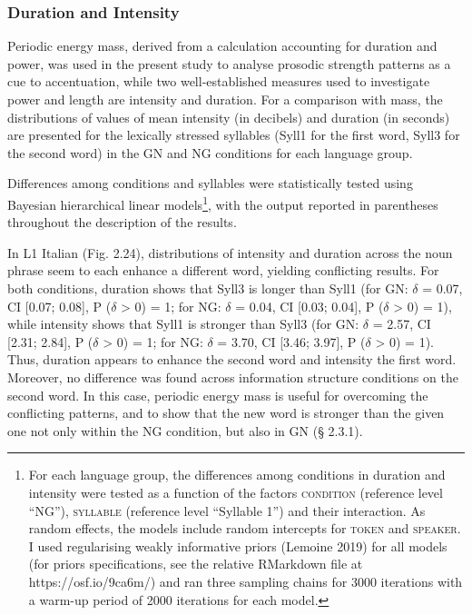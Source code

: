 \subsubsection[Duration and Intensity]{Duration and Intensity}
\hypertarget{Toc191305919}{}\begin{styleStandard}
Periodic energy mass, derived from a calculation accounting for duration and power, was used in the present study to analyse prosodic strength patterns as a cue to accentuation, while two well-established measures used to investigate power and length are intensity and duration. For a comparison with mass, the distributions of values of mean intensity (in decibels) and duration (in seconds) are presented for the lexically stressed syllables (Syll1 for the first word, Syll3 for the second word) in the GN and NG conditions for each language group.
\end{styleStandard}

\begin{styleStandard}
Differences among conditions and syllables were statistically tested using Bayesian hierarchical linear models\footnote{For each language group, the differences among conditions in duration and intensity were tested as a function of the factors \textsc{condition} (reference level “NG”), \textsc{syllable} (reference level “Syllable 1”) and their interaction. As random effects, the models include random intercepts for \textsc{token} and \textsc{speaker}. I used regularising weakly informative priors (Lemoine 2019) for all models (for priors specifications, see the relative RMarkdown file at https://osf.io/9ca6m/) and ran three sampling chains for 3000 iterations with a warm-up period of 2000 iterations for each model.}, with the output reported in parentheses throughout the description of the results.
\end{styleStandard}

\begin{styleStandard}
In L1 Italian (Fig. 2.24), distributions of intensity and duration across the noun phrase seem to each enhance a different word, yielding conflicting results. For both conditions, duration shows that Syll3 is longer than Syll1 (for GN: $\delta $ = 0.07, CI [0.07; 0.08], P ($\delta $ {\textgreater} 0) = 1; for NG: $\delta $ = 0.04, CI [0.03; 0.04], P ($\delta $ {\textgreater} 0) = 1), while intensity shows that Syll1 is stronger than Syll3 (for GN: $\delta $ = 2.57, CI [2.31; 2.84], P ($\delta $ {\textgreater} 0) = 1; for NG: $\delta $ = 3.70, CI [3.46; 3.97], P ($\delta $ {\textgreater} 0) = 1). Thus, duration appears to enhance the second word and intensity the first word. Moreover, no difference was found across information structure conditions on the second word. In this case, periodic energy mass\textit{ }is useful for overcoming the conflicting patterns, and to show that the new word is stronger than the given one not only within the NG condition, but also in GN (§ 2.3.1).
\end{styleStandard}

